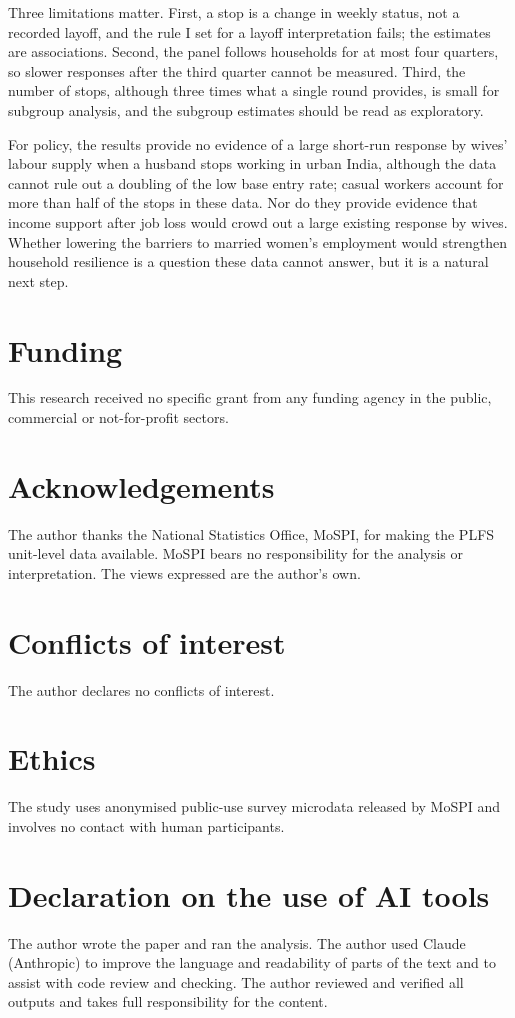 Three limitations matter. First, a stop is a change in weekly status, not a recorded layoff, and the rule I set for a layoff interpretation fails; the estimates are associations. Second, the panel follows households for at most four quarters, so slower responses after the third quarter cannot be measured. Third, the number of stops, although three times what a single round provides, is small for subgroup analysis, and the subgroup estimates should be read as exploratory.

For policy, the results provide no evidence of a large short-run response by wives' labour supply when a husband stops working in urban India, although the data cannot rule out a doubling of the low base entry rate; casual workers account for more than half of the stops in these data. Nor do they provide evidence that income support after job loss would crowd out a large existing response by wives. Whether lowering the barriers to married women's employment would strengthen household resilience is a question these data cannot answer, but it is a natural next step.

\section*{Funding}
This research received no specific grant from any funding agency in the public, commercial or not-for-profit sectors.

\section*{Acknowledgements}
The author thanks the National Statistics Office, MoSPI, for making the PLFS unit-level data available. MoSPI bears no responsibility for the analysis or interpretation. The views expressed are the author's own.

\section*{Conflicts of interest}
The author declares no conflicts of interest.

\section*{Ethics}
The study uses anonymised public-use survey microdata released by MoSPI and involves no contact with human participants.

\section*{Declaration on the use of AI tools}
The author wrote the paper and ran the analysis. The author used Claude (Anthropic) to improve the language and readability of parts of the text and to assist with code review and checking. The author reviewed and verified all outputs and takes full responsibility for the content.


